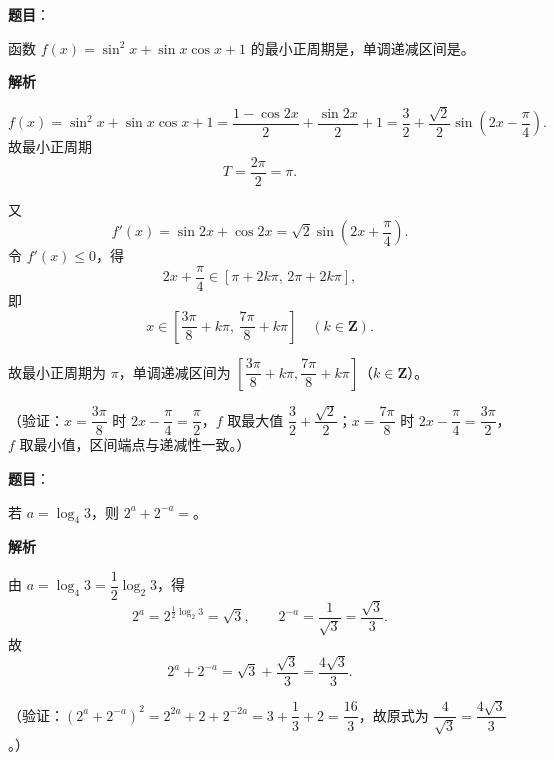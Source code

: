 \begin{answer}

\textbf{题目}：

函数 \(f(x)=\sin^2x+\sin x\cos x+1\) 的最小正周期是\gkblank{}，单调递减区间是\gkblank{}。

\textbf{解析}

\nopagebreak[4]
\[
f(x)=\sin^2x+\sin x\cos x+1
=\frac{1-\cos2x}{2}+\frac{\sin2x}{2}+1
=\frac32+\frac{\sqrt2}{2}\sin\left(2x-\frac{\pi}{4}\right).
\]
故最小正周期
\nopagebreak[4]
\[
T=\frac{2\pi}{2}=\pi.
\]

又
\nopagebreak[4]
\[
f'(x)=\sin2x+\cos2x=\sqrt2\sin\left(2x+\frac{\pi}{4}\right).
\]
令 \(f'(x)\leqslant0\)，得
\nopagebreak[4]
\[
2x+\frac{\pi}{4}\in\left[\pi+2k\pi,\,2\pi+2k\pi\right],
\]
即
\nopagebreak[4]
\[
x\in\left[\frac{3\pi}{8}+k\pi,\,\frac{7\pi}{8}+k\pi\right]\quad(k\in\mathbf{Z}).
\]

故最小正周期为 \(\pi\)，单调递减区间为 \(\left[\dfrac{3\pi}{8}+k\pi,\dfrac{7\pi}{8}+k\pi\right]\)（\(k\in\mathbf{Z}\)）。

（验证：\(x=\dfrac{3\pi}{8}\) 时 \(2x-\dfrac{\pi}{4}=\dfrac{\pi}{2}\)，\(f\) 取最大值 \(\dfrac32+\dfrac{\sqrt2}{2}\)；\(x=\dfrac{7\pi}{8}\) 时 \(2x-\dfrac{\pi}{4}=\dfrac{3\pi}{2}\)，\(f\) 取最小值，区间端点与递减性一致。）


\end{answer}
\begin{answer}

\textbf{题目}：

若 \(a=\log_4 3\)，则 \(2^a+2^{-a}=\)\gkblank{}。

\textbf{解析}

由 \(a=\log_4 3=\dfrac12\log_2 3\)，得
\nopagebreak[4]
\[
2^a=2^{\frac12\log_2 3}=\sqrt3,\qquad
2^{-a}=\frac{1}{\sqrt3}=\frac{\sqrt3}{3}.
\]
故
\nopagebreak[4]
\[
2^a+2^{-a}=\sqrt3+\frac{\sqrt3}{3}=\frac{4\sqrt3}{3}.
\]

（验证：\((2^a+2^{-a})^2=2^{2a}+2+2^{-2a}=3+\dfrac13+2=\dfrac{16}{3}\)，故原式为 \(\dfrac{4}{\sqrt3}=\dfrac{4\sqrt3}{3}\)。）


\end{answer}
